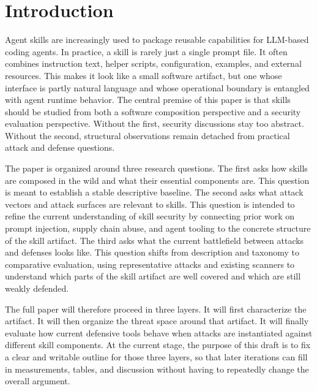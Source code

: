 \documentclass[conference]{IEEEtran}
\begin{document}
\begin{IEEEkeywords}
\end{IEEEkeywords}

\section{Introduction}

Agent skills are increasingly used to package reusable capabilities for
LLM-based coding agents. In practice, a skill is rarely just a single
prompt file. It often combines instruction text, helper scripts,
configuration, examples, and external resources. This makes it look like
a small software artifact, but one whose interface is partly natural
language and whose operational boundary is entangled with agent runtime
behavior. The central premise of this paper is that skills should be
studied from both a software composition perspective and a security
evaluation perspective. Without the first, security discussions stay too
abstract. Without the second, structural observations remain detached
from practical attack and defense questions.

The paper is organized around three research questions. The first asks
how skills are composed in the wild and what their essential components
are. This question is meant to establish a stable descriptive baseline.
The second asks what attack vectors and attack surfaces are relevant to
skills. This question is intended to refine the current understanding of
skill security by connecting prior work on prompt injection, supply
chain abuse, and agent tooling to the concrete structure of the skill
artifact. The third asks what the current battlefield between attacks
and defenses looks like. This question shifts from description and
taxonomy to comparative evaluation, using representative attacks and
existing scanners to understand which parts of the skill artifact are
well covered and which are still weakly defended.

The full paper will therefore proceed in three layers. It will first
characterize the artifact. It will then organize the threat space around
that artifact. It will finally evaluate how current defensive tools
behave when attacks are instantiated against different skill
components. At the current stage, the purpose of this draft is to fix a
clear and writable outline for those three layers, so that later
iterations can fill in measurements, tables, and discussion without
having to repeatedly change the overall argument.
\end{document}
